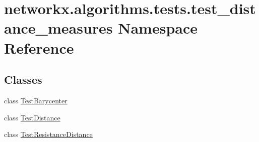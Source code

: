\hypertarget{namespacenetworkx_1_1algorithms_1_1tests_1_1test__distance__measures}{}\section{networkx.\+algorithms.\+tests.\+test\+\_\+distance\+\_\+measures Namespace Reference}
\label{namespacenetworkx_1_1algorithms_1_1tests_1_1test__distance__measures}
\subsection*{Classes}
\begin{DoxyCompactItemize}
\item 
class \hyperlink{classnetworkx_1_1algorithms_1_1tests_1_1test__distance__measures_1_1TestBarycenter}{Test\+Barycenter}
\item 
class \hyperlink{classnetworkx_1_1algorithms_1_1tests_1_1test__distance__measures_1_1TestDistance}{Test\+Distance}
\item 
class \hyperlink{classnetworkx_1_1algorithms_1_1tests_1_1test__distance__measures_1_1TestResistanceDistance}{Test\+Resistance\+Distance}
\end{DoxyCompactItemize}
